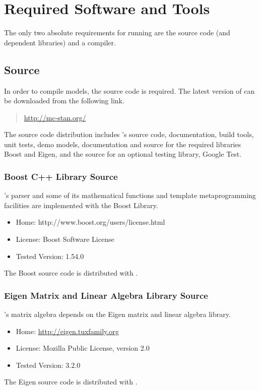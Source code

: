 \section{Required Software and Tools}

The only two absolute requirements for running \Stan are the
\Stan source code (and dependent libraries) and a \Cpp compiler.

\subsection{\Stan Source}

In order to compile \Stan models, the \Stan source code is required.
The latest version of \Stan can be downloaded from the following link.
%
\begin{quote}
\url{http://mc-stan.org/}
\end{quote}
%
The \Stan source code distribution includes \Stan's source code,
documentation, build tools, unit tests, demo models, documentation and
source for the required libraries Boost and Eigen, and the source for
an optional testing library, Google Test.

\subsubsection{Boost C++ Library Source}

\Stan's parser and some of its mathematical functions and 
template metaprogramming facilities are implemented with the Boost
\Cpp Library.  
%
\begin{itemize}
\item Home: http://www.boost.org/users/license.html
\item License: Boost Software License
\item Tested Version: 1.54.0
\end{itemize}
%
The Boost source code is distributed with \Stan.


\subsubsection{Eigen Matrix and Linear Algebra Library Source}

\Stan's matrix algebra depends on the Eigen \Cpp matrix and linear
algebra library.  
%
\begin{itemize}
\item Home: \url{http://eigen.tuxfamily.org}
\item License: Mozilla Public License, version 2.0
\item Tested Version: 3.2.0
\end{itemize}
%
The Eigen source code is distributed with \Stan.


